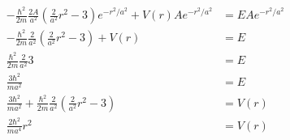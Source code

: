 \documentclass{article}
\begin{document}
\begin{enumerate}
  \begin{align*}
    -\frac{\hbar^2}{2 m} \frac{2 A}{a^2} \left( \frac{2}{a^2} r^2 - 3 \right) e^{-r^2 / a^2} + V(r) A e^{-r^2 / a^2} &= E A e^{-r^2 / a^2} \\
    -\frac{\hbar^2}{2 m} \frac{2}{a^2} \left( \frac{2}{a^2} r^2 - 3 \right) + V(r) &= E \\
    \frac{\hbar^2}{2 m} \frac{2}{a^2} 3 &= E \\
    \frac{3 \hbar^2}{m a^2} &= E \\
    \frac{3 \hbar^2}{m a^2} + \frac{\hbar^2}{2 m} \frac{2}{a^2} \left( \frac{2}{a^2} r^2 - 3 \right) &= V(r) \\
    \frac{2 \hbar^2}{m a^4} r^2 &= V(r) \\
  \end{align*}
\end{enumerate}

\subsection{}
\end{document}
